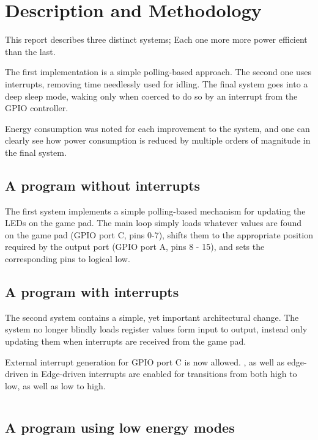 \section{Description and Methodology}

This report describes three distinct systems; Each one more more power efficient than the last.

The first implementation is a simple polling-based approach. The second one uses interrupts, removing time needlessly used for idling. The final system goes into a deep sleep mode, waking only when coerced to do so by an interrupt from the GPIO controller.

Energy consumption was noted for each improvement to the system, and one can clearly see how power consumption is reduced by multiple orders of magnitude in the final system.

\subsection{A program without interrupts}

The first system implements a simple polling-based mechanism for updating the LEDs on the game pad. The main loop simply loads whatever values are found on the game pad (GPIO port C, pins 0-7), shifts them to the appropriate position required by the output port (GPIO port A, pins 8 - 15), and sets the corresponding pins to logical low.

\subsection{A program with interrupts}

The second system contains a simple, yet important architectural change. The system no longer blindly loads register values form input to output, instead only updating them when interrupts are received from the game pad.

External interrupt generation for GPIO port C is now allowed. , as well as edge-driven in
Edge-driven interrupts are enabled for transitions from both high to low, as well as low to high.

\begin{lstlisting}
\end{lstlisting}


\subsection{A program using low energy modes}

